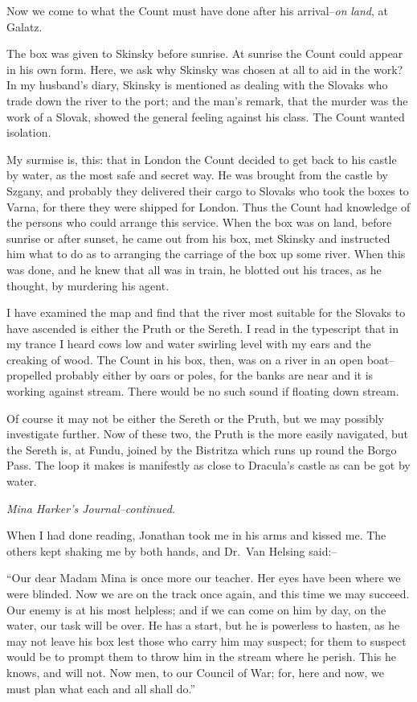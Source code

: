 \documentclass[12pt,openright]{book}
\begin{document}
Now we come to what the Count must have done after his arrival–\textit{on}\textit{ }\textit{land}, at Galatz.

The box was given to Skinsky before sunrise. At sunrise the Count could appear in his own form. Here, we ask why Skinsky was chosen at all to aid in the work? In my husband’s diary, Skinsky is mentioned as dealing with the Slovaks who trade down the river to the port; and the man’s remark, that the murder was the work of a Slovak, showed the general feeling against his class. The Count wanted isolation.

My surmise is, this: that in London the Count decided to get back to his castle by water, as the most safe and secret way. He was brought from the castle by Szgany, and probably they delivered their cargo to Slovaks who took the boxes to Varna, for there they were shipped for London. Thus the Count had knowledge of the persons who could arrange this service. When the box was on land, before sunrise or after sunset, he came out from his box, met Skinsky and instructed him what to do as to arranging the carriage of the box up some river. When this was done, and he knew that all was in train, he blotted out his traces, as he thought, by murdering his agent.

I have examined the map and find that the river most suitable for the Slovaks to have ascended is either the Pruth or the Sereth. I read in the typescript that in my trance I heard cows low and water swirling level with my ears and the creaking of wood. The Count in his box, then, was on a river in an open boat–propelled probably either by oars or poles, for the banks are near and it is working against stream. There would be no such sound if floating down stream.

Of course it may not be either the Sereth or the Pruth, but we may possibly investigate further. Now of these two, the Pruth is the more easily navigated, but the Sereth is, at Fundu, joined by the Bistritza which runs up round the Borgo Pass. The loop it makes is manifestly as close to Dracula’s castle as can be got by water.

\textit{Mina Harker’s Journal–continued.}

When I had done reading, Jonathan took me in his arms and kissed me. The others kept shaking me by both hands, and Dr. Van Helsing said:–

“Our dear Madam Mina is once more our teacher. Her eyes have been where we were blinded. Now we are on the track once again, and this time we may succeed. Our enemy is at his most helpless; and if we can come on him by day, on the water, our task will be over. He has a start, but he is powerless to hasten, as he may not leave his box lest those who carry him may suspect; for them to suspect would be to prompt them to throw him in the stream where he perish. This he knows, and will not. Now men, to our Council of War; for, here and now, we must plan what each and all shall do.”
\end{document}
